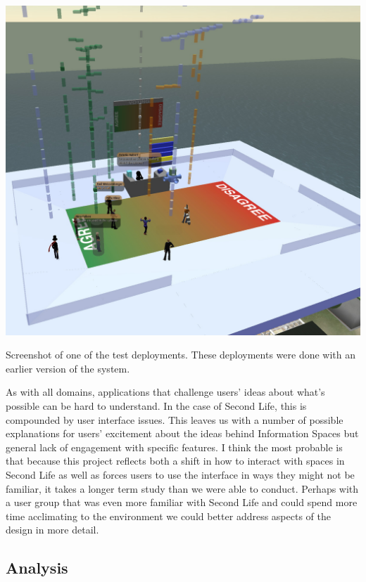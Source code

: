 \begin{marginfigure}
	\includegraphics{figures/meeting_space_trial_2.jpg}
	\caption{Screenshot of one of the test deployments. These deployments were done with an earlier version of the system.}
	\label{fig:meeting_space_trial_2}
\end{marginfigure}



As with all domains, applications that challenge users' ideas about what's possible can be hard to understand. In the case of Second Life, this is compounded by user interface issues. This leaves us with a number of possible explanations for users' excitement about the ideas behind Information Spaces but general lack of engagement with specific features. I think the most probable is that because this project reflects both a shift in how to interact with spaces in Second Life as well as forces users to use the interface in ways they might not be familiar, it takes a longer term study than we were able to conduct. Perhaps with a user group that was even more familiar with Second Life and could spend more time acclimating to the environment we could better address aspects of the design in more detail.

\subsection{Analysis}

